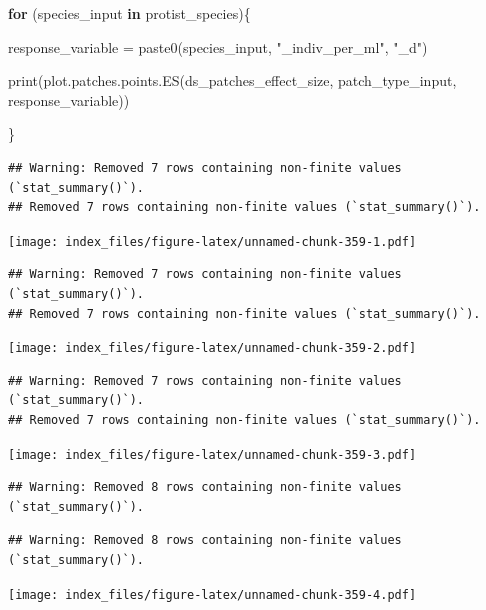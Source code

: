 \documentclass[
]{article}
\newenvironment{Shaded}{\begin{snugshade}}{\end{snugshade}}
\newcommand{\ControlFlowTok}[1]{\textcolor[rgb]{0.13,0.29,0.53}{\textbf{#1}}}
\newcommand{\FunctionTok}[1]{\textcolor[rgb]{0.00,0.00,0.00}{#1}}
\newcommand{\NormalTok}[1]{#1}
\newcommand{\OtherTok}[1]{\textcolor[rgb]{0.56,0.35,0.01}{#1}}
\newcommand{\StringTok}[1]{\textcolor[rgb]{0.31,0.60,0.02}{#1}}
\begin{document}
\begin{Shaded}
\begin{Highlighting}[]
\ControlFlowTok{for}\NormalTok{ (species\_input }\ControlFlowTok{in}\NormalTok{ protist\_species)\{}
  
\NormalTok{  response\_variable }\OtherTok{=} \FunctionTok{paste0}\NormalTok{(species\_input, }\StringTok{"\_indiv\_per\_ml"}\NormalTok{, }\StringTok{"\_d"}\NormalTok{)}
  
  \FunctionTok{print}\NormalTok{(}\FunctionTok{plot.patches.points.ES}\NormalTok{(ds\_patches\_effect\_size, patch\_type\_input,}
\NormalTok{                               response\_variable))}
  
\NormalTok{\}}
\end{Highlighting}
\end{Shaded}

\begin{verbatim}
## Warning: Removed 7 rows containing non-finite values (`stat_summary()`).
## Removed 7 rows containing non-finite values (`stat_summary()`).
\end{verbatim}

\texttt{[image: index\_files/figure-latex/unnamed-chunk-359-1.pdf]}

\begin{verbatim}
## Warning: Removed 7 rows containing non-finite values (`stat_summary()`).
## Removed 7 rows containing non-finite values (`stat_summary()`).
\end{verbatim}

\texttt{[image: index\_files/figure-latex/unnamed-chunk-359-2.pdf]}

\begin{verbatim}
## Warning: Removed 7 rows containing non-finite values (`stat_summary()`).
## Removed 7 rows containing non-finite values (`stat_summary()`).
\end{verbatim}

\texttt{[image: index\_files/figure-latex/unnamed-chunk-359-3.pdf]}

\begin{verbatim}
## Warning: Removed 8 rows containing non-finite values (`stat_summary()`).
\end{verbatim}

\begin{verbatim}
## Warning: Removed 8 rows containing non-finite values (`stat_summary()`).
\end{verbatim}

\texttt{[image: index\_files/figure-latex/unnamed-chunk-359-4.pdf]}
\end{document}
